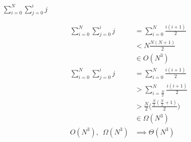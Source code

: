 \question $\displaystyle\sum_{i = 0}^{N} \sum_{j = 0}^{i} j$
\begin{solution}[2in]
\begin{align*}
\sum_{i = 0}^{N} \sum_{j = 0}^{i} j
&= \sum_{i = 0}^{N} \frac{i(i + 1)}{2} \\
&< N\frac{N(N + 1)}{2} \\
&\in O(N^3) \\
\sum_{i = 0}^{N} \sum_{j = 0}^{i} j
&= \sum_{i = 0}^{N} \frac{i(i + 1)}{2} \\
&> \sum_{i = \frac{N}{2}}^{N} \frac{i(i + 1)}{2} \\
&> \frac{N}{2}\Bigg(\frac{\frac{N}{2}(\frac{N}{2} + 1)}{2}\Bigg) \\
&\in \Omega(N^3) \\
O(N^3), \enspace \Omega(N^3) &\implies \Theta(N^3)
\end{align*}
\end{solution}